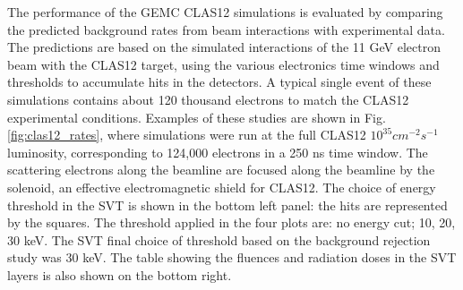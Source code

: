 The performance of the GEMC CLAS12 simulations is evaluated by comparing the predicted background
rates from beam interactions with experimental data.
The predictions are based on the simulated interactions of the 11 GeV electron beam
with the CLAS12 target, using the various electronics time windows and thresholds
to accumulate hits in the detectors.
A typical single event of these simulations contains about 120 thousand electrons to match
the CLAS12 experimental conditions.
Examples of these studies are shown in Fig.\ref{fig:clas12_rates}, where simulations were run
at the full CLAS12 $10^{35} cm^{-2} s^{-1}$
luminosity, corresponding to 124,000 electrons in a 250 ns time window.
The scattering electrons along the beamline are focused along the beamline by the solenoid,
an effective electromagnetic shield for CLAS12.
The choice of energy threshold in the SVT
is shown in the bottom left panel: the hits are represented by the squares.
The threshold applied in the four plots are: no energy cut; 10, 20, 30 keV.
The SVT final choice of threshold based on the background rejection study was 30 keV.
The table showing the fluences and radiation doses in the SVT layers is also shown on the bottom right.

